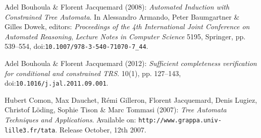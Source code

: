 \documentclass[copyright,creativecommons]{eptcs}
\begin{document}

\begin{thebibliography}{10}
\providecommand{\bibitemdeclare}[2]{}
\providecommand{\surnamestart}{}
\providecommand{\surnameend}{}
\providecommand{\urlprefix}{Available at }
\providecommand{\url}[1]{\texttt{#1}}
\providecommand{\href}[2]{\texttt{#2}}
\providecommand{\urlalt}[2]{\href{#1}{#2}}
\providecommand{\doi}[1]{doi:\urlalt{http://dx.doi.org/#1}{#1}}
\providecommand{\bibinfo}[2]{#2}

\bibitemdeclare{inproceedings}{BJ08}
\bibinfo{author}{Adel \surnamestart Bouhoula\surnameend} \&
  \bibinfo{author}{Florent \surnamestart Jacquemard\surnameend}
  (\bibinfo{year}{2008}): \emph{\bibinfo{title}{Automated Induction with
  Constrained Tree Automata}}.
\newblock In \bibinfo{editor}{Alessandro \surnamestart Armando\surnameend},
  \bibinfo{editor}{Peter \surnamestart Baumgartner\surnameend} \&
  \bibinfo{editor}{Gilles \surnamestart Dowek\surnameend}, editors: {\sl
  \bibinfo{booktitle}{Proceedings of the 4th International Joint Conference on
  Automated Reasoning}}, {\sl \bibinfo{series}{Lecture Notes in
  Computer Science}} \bibinfo{volume}{5195}, \bibinfo{publisher}{Springer}, pp.
  \bibinfo{pages}{539--554}, \doi{10.1007/978-3-540-71070-7\_44}.

\bibitemdeclare{article}{BJ12}
\bibinfo{author}{Adel \surnamestart Bouhoula\surnameend} \&
  \bibinfo{author}{Florent \surnamestart Jacquemard\surnameend}
  (\bibinfo{year}{2012}): \emph{\bibinfo{title}{Sufficient completeness
  verification for conditional and constrained {TRS}}}.
\newblock {\sl \bibinfo{journal}{Journal of Applied Logic}}
  \bibinfo{volume}{10}(\bibinfo{number}{1}), pp. \bibinfo{pages}{127--143},
  \doi{10.1016/j.jal.2011.09.001}.

\bibitemdeclare{misc}{TATA}
\bibinfo{author}{Hubert \surnamestart Comon\surnameend}, \bibinfo{author}{Max
  \surnamestart Dauchet\surnameend}, \bibinfo{author}{R\'emi \surnamestart
  Gilleron\surnameend}, \bibinfo{author}{Florent \surnamestart
  Jacquemard\surnameend}, \bibinfo{author}{Denis \surnamestart
  Lugiez\surnameend}, \bibinfo{author}{Christof \surnamestart
  L\"oding\surnameend}, \bibinfo{author}{Sophie \surnamestart Tison\surnameend}
  \& \bibinfo{author}{Marc \surnamestart Tommasi\surnameend}
  (\bibinfo{year}{2007}): \emph{\bibinfo{title}{Tree Automata Techniques and
  Applications}}.
\newblock \bibinfo{howpublished}{Available on:
  \url{http://www.grappa.univ-lille3.fr/tata}}.
\newblock \bibinfo{note}{Release October, 12th 2007}.


\end{thebibliography}
\end{document}
